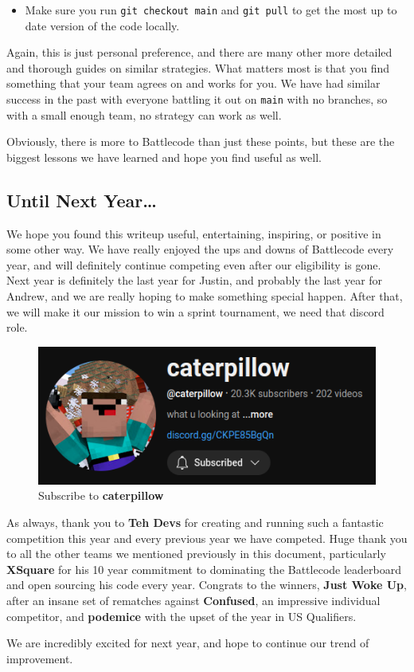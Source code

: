 \begin{enumerate}
\begin{itemize}
    \item Make sure you run \verb|git checkout main| and \verb|git pull| to get the most up to date version of the code locally.
  \end{itemize}
  Again, this is just personal preference, and there are many other more detailed and thorough guides on similar strategies. What matters most is that you find something that your team agrees on and works for you. We have had similar success in the past with everyone battling it out on \verb|main| with no branches, so with a small enough team, no strategy can work as well.
\end{enumerate}

Obviously, there is more to Battlecode than just these points, but these are the biggest lessons we have learned and hope you find useful as well.

\subsection{Until Next Year\dots}

We hope you found this writeup useful, entertaining, inspiring, or positive in some other way. We have really enjoyed the ups and downs of Battlecode every year, and will definitely continue competing even after our eligibility is gone. Next year is definitely the last year for Justin, and probably the last year for Andrew, and we are really hoping to make something special happen. After that, we will make it our mission to win a sprint tournament, we need that discord role.

\begin{figure}[H]
  \centering
  \includegraphics[scale=0.5]{images/caterpillow.png}
  \caption{Subscribe to \textbf{caterpillow}}
\end{figure}

As always, thank you to \textbf{Teh Devs} for creating and running such a fantastic competition this year and every previous year we have competed. Huge thank you to all the other teams we mentioned previously in this document, particularly \textbf{XSquare} for his 10 year commitment to dominating the Battlecode leaderboard and open sourcing his code every year. Congrats to the winners, \textbf{Just Woke Up}, after an insane set of rematches against \textbf{Confused}, an impressive individual competitor, and \textbf{podemice} with the upset of the year in US Qualifiers.

\medskip

We are incredibly excited for next year, and hope to continue our trend of improvement.
